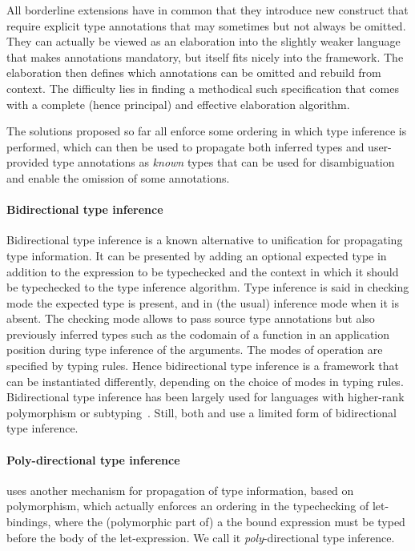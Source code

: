 \documentclass[acmsmall,screen,nonacm]{acmart}
\begin{document}
All borderline extensions have in common that they introduce new construct
that require explicit type annotations that may sometimes but not always be
omitted. They can actually be viewed as an elaboration into the slightly weaker
language that makes annotations mandatory, but itself fits nicely into
the \ML framework. The elaboration then defines which annotations can be
omitted and rebuild from context.
%
The difficulty lies in finding a methodical such specification that comes
with a complete (hence principal) and effective elaboration algorithm.

The solutions proposed so far all enforce some ordering in which type
inference is performed, which can then be used to propagate both inferred
types and user-provided type annotations as \emph{known} types that can be
used for disambiguation and enable the omission of some annotations.

\paragraph{Bidirectional type inference}

Bidirectional type inference is a known alternative to unification for
propagating type information. It can be presented by adding an optional
expected type in addition to the expression to be typechecked and the
context in which it should be typechecked to the type inference algorithm.
Type inference is said in checking mode the expected type is present, and in
(the usual) inference mode when it is absent. The checking mode allows to
pass source type annotations but also previously inferred types such as the
codomain of a function in an application position during type inference of
the arguments.  The modes of operation are specified by typing rules.  Hence
bidirectional type inference is a framework that can be instantiated
differently, depending on the choice of modes in typing rules.
Bidirectional type inference has been largely used for languages with
higher-rank polymorphism or subtyping~. Still, both \OCaml
and \Haskell use a limited form of bidirectional type inference.



\paragraph{Poly-directional type inference}

\OCaml uses another mechanism for propagation of type
information, based on polymorphism, which actually enforces an ordering in
the typechecking of let-bindings, where the (polymorphic part of) a the
bound expression must be typed before the body of the let-expression.
We call it \emph{poly}-directional type inference.
\end{document}
